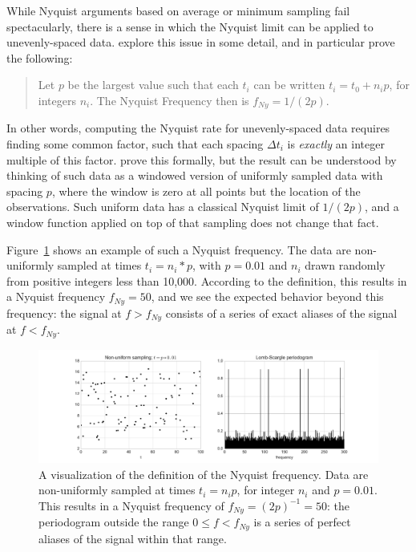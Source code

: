 \documentclass[preprint]{aastex}
\newcommand{\Fig}[1]{Figure~\ref{fig:#1}}
\newcommand{\figlabel}[1]{\label{fig:#1}}
\begin{document}
While Nyquist arguments based on average or minimum sampling fail spectacularly,
there is a sense in which the Nyquist limit can be applied to unevenly-spaced
data. \citet{Eyer99} explore this issue in some detail, and in particular
prove the following:
\begin{quote}
Let $p$ be the largest value such that each $t_i$ can be written $t_i = t_0 + n_i p$, for integers $n_i$. The Nyquist Frequency then is $f_{Ny} = 1 / (2p)$.
\end{quote}
In other words, computing the Nyquist rate for unevenly-spaced data requires
finding some common factor, such that each spacing $\Delta t_i$ is {\it exactly}
an integer multiple of this factor.
\citet{Eyer99} prove this formally, but the result can be understood
by thinking of such data as a windowed version of uniformly sampled
data with spacing $p$, where the window is zero at all points but the
location of the observations.
Such uniform data has a classical Nyquist limit of $1/(2p)$, and a window
function applied on top of that sampling does not change that fact.

\Fig{nyquist-eyer99} shows an example of such a Nyquist frequency.
The data are non-uniformly sampled at times $t_i = n_i * p$, with $p=0.01$
and $n_i$ drawn randomly from positive integers less than 10,000.
According to the \citet{Eyer99} definition,
this results in a Nyquist frequency $f_{Ny} = 50$, and we see the expected
behavior beyond this frequency: the signal at $f > f_{Ny}$ consists of a series
of exact aliases of the signal at $f < f_{Ny}$.

\begin{figure}[ht]
  \centering
  \includegraphics[width=\textwidth]{fig13_nyquist_eyer99}
  \caption{A visualization of the \citet{Eyer99} definition of the Nyquist
    frequency. Data are non-uniformly sampled at times $t_i = n_i p$, for
    integer $n_i$ and $p=0.01$.
    This results in a Nyquist frequency of $f_{Ny}= (2p)^{-1} = 50$:
    the periodogram outside the range $0 \le f < f_{Ny}$ is a series of
    perfect aliases of the signal within that range.
    \figlabel{nyquist-eyer99}}
\end{figure}
\end{document}
